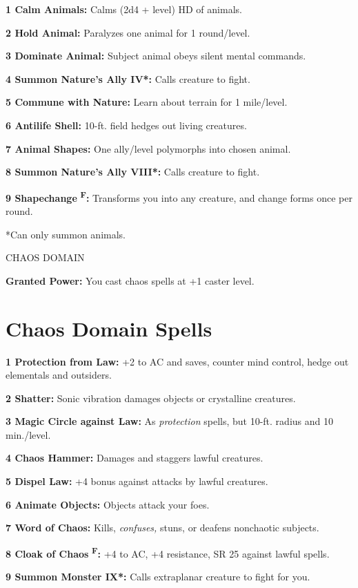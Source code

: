 \documentclass{article}
\begin{document}
\textbf{1 Calm Animals:} Calms (2d4 + level) HD of animals.

\textbf{2 Hold Animal: }Paralyzes one animal for 1 round/level.

\textbf{3 Dominate Animal:} Subject animal obeys silent mental commands.

\textbf{4 Summon Nature's Ally IV*:} Calls creature to fight.

\textbf{5 Commune with Nature: }Learn about terrain for 1 mile/level.

\textbf{6 Antilife Shell: }10-ft. field hedges out living creatures.

\textbf{7 Animal Shapes:} One ally/level polymorphs into chosen animal.

\textbf{8 Summon Nature's Ally VIII*:} Calls creature to fight.

\textbf{9 Shapechange }\textsuperscript{\textbf{F}}\textbf{:} Transforms you into 
any creature, and change forms once per round.

*Can only summon animals.

\vspace{12pt}
CHAOS DOMAIN

\textbf{Granted Power:} You cast chaos spells at +1 caster level.

\section*{\textbf{Chaos Domain Spells}}

\textbf{1 Protection from Law:} +2 to AC and saves, counter mind control, hedge 
out elementals and outsiders.

\textbf{2 Shatter:} Sonic vibration damages objects or crystalline creatures.

\textbf{3 Magic Circle against Law:} As \textit{protection }spells, but 10-ft. 
radius and 10 min./level.

\textbf{4 Chaos Hammer:} Damages and staggers lawful creatures.

\textbf{5 Dispel Law: }+4 bonus against attacks by lawful creatures.

\textbf{6 Animate Objects:} Objects attack your foes.

\textbf{7 Word of Chaos:} Kills, \textit{confuses, }stuns, or deafens nonchaotic 
subjects.

\textbf{8 Cloak of Chaos }\textsuperscript{\textbf{F}}\textbf{: }+4 to AC, +4 resistance, 
SR 25 against lawful spells.

\textbf{9 Summon Monster IX*:} Calls extraplanar creature to fight for you.
\end{document}

